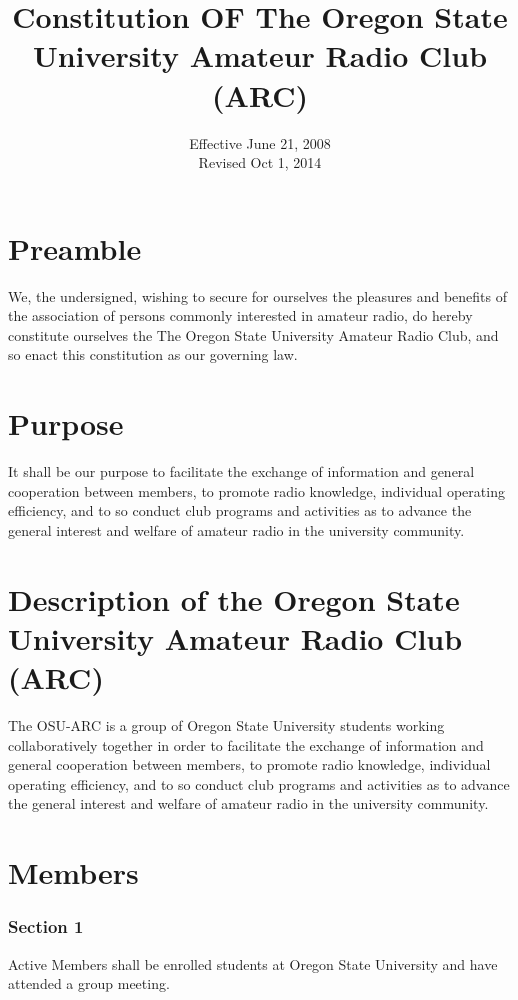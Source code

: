 \documentclass[10pt,letterpaper]{article}
\title{Constitution OF The Oregon State University Amateur Radio Club (ARC)}
\date{Effective June 21, 2008 \\ Revised Oct 1, 2014}
\begin{document}
 
\maketitle


\renewcommand\partname{Article}


\part{Preamble}

We, the undersigned, wishing to secure for ourselves the pleasures and benefits of the association of persons commonly interested in amateur radio, do hereby constitute ourselves the The Oregon State University Amateur Radio Club, and so enact this constitution as our governing law.


\part{Purpose}


It shall be our purpose to facilitate the exchange of information and general cooperation between members, to promote radio knowledge, individual operating efficiency, and to so conduct club programs and activities as to advance the general interest and welfare of amateur radio in the university community.

\part{Description of the Oregon State University Amateur Radio Club (ARC)}

The OSU-ARC is a group of Oregon State University students working collaboratively together in order to facilitate the exchange of information and general cooperation between members, to promote radio knowledge, individual operating efficiency, and to so conduct club programs and activities as to advance the general interest and welfare of amateur radio in the university community.

\part{Members}

\section*{Section 1} Active Members shall be enrolled students at Oregon State University and have attended a group meeting.
\end{document}
